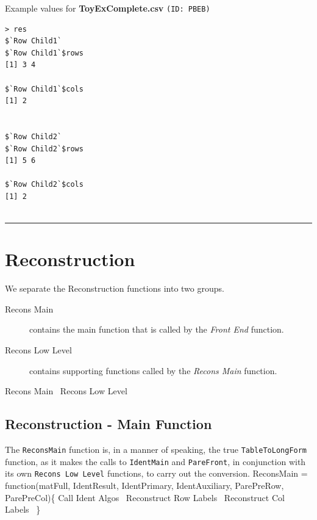 \documentclass[a4paper]{article}
\begin{document}
Example values for \textbf{ToyExComplete.csv} \texttt{(ID: PBEB)}
\begin{verbatim}
> res
$`Row Child1`
$`Row Child1`$rows
[1] 3 4

$`Row Child1`$cols
[1] 2


$`Row Child2`
$`Row Child2`$rows
[1] 5 6

$`Row Child2`$cols
[1] 2


\end{verbatim}
\vspace{-1.5em}
\noindent\rule{0.25\textwidth}{0.4pt}
\vspace{0.5em}

\section{Reconstruction}
\label{sec:reconstruction}
We separate the Reconstruction functions into two groups.
\begin{description}
\item[Recons Main] contains the main function that is called by the
  \emph{Front End} function.
\item[Recons Low Level] contains supporting functions called by the
  \emph{Recons Main} function.
\end{description}
\nwenddocs{}\endmoddef
\LA{}Recons Main~{\nwtagstyle{}}\RA{}
\LA{}Recons Low Level~{\nwtagstyle{}}\RA{}
\nwendcode{}\nwdocspar

\subsection{Reconstruction - Main Function}
\label{sec:ReconsMain}
The \verb|ReconsMain| function is, in a manner of speaking, the true
\verb|TableToLongForm| function, as it makes the calls to
\verb|IdentMain| and \verb|PareFront|, in conjunction with its own
\verb|Recons Low Level| functions, to carry out the conversion.
\nwenddocs{}\endmoddef
ReconsMain =
  function(matFull, IdentResult,
           IdentPrimary, IdentAuxiliary,
           ParePreRow, ParePreCol)\{
    \LA{}Call Ident Algos~{\nwtagstyle{}}\RA{}
    \LA{}Reconstruct Row Labels~{\nwtagstyle{}}\RA{}
    \LA{}Reconstruct Col Labels~{\nwtagstyle{}}\RA{}
  \}
\eatline
{}\nwendcode{}\nwdocspar
\end{document}
